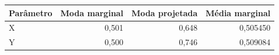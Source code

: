 \begin{tabular}{lrrr}
\toprule
Parâmetro & Moda marginal & Moda projetada & Média marginal \\
\midrule
X & 0,501 & 0,648 & 0,505450 \\
Y & 0,500 & 0,746 & 0,509084 \\
\bottomrule
\end{tabular}
